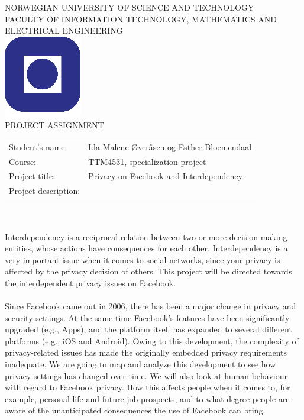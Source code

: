 \documentclass[a4paper,11pt]{article}
\begin{document}
\sffamily
\begin{titlepage}
\begin{center}
\textsc{NORWEGIAN UNIVERSITY OF SCIENCE AND TECHNOLOGY\\
FACULTY OF  INFORMATION TECHNOLOGY, MATHEMATICS AND ELECTRICAL ENGINEERING} \\
\vspace{0.5cm} 
\includegraphics[scale=0.5]{NTNU-logo} \\
\vspace{0.5cm}
{\Huge{PROJECT ASSIGNMENT}}
\vspace{0.5cm}
\end{center}

\begin{tabular}{@{}p{5cm}l}
Student's name:		& Ida Malene Øveråsen og Esther Bloemendaal\\
Course: 		& TTM4531, specialization project \\
Project title: 		& Privacy on Facebook and Interdependency \\
Project description: 	& \\
\end{tabular}
\\
\\
Interdependency is a reciprocal relation between two or more decision-making entities, whose actions have consequences for each other. Interdependency is a very important issue when it comes to social networks, since your privacy is affected by the privacy decision of others. This project will be directed towards the interdependent privacy issues on Facebook.
\paragraph{}
Since Facebook came out in 2006, there has been a major change in privacy and security settings. At the same time Facebook's features have been significantly upgraded (e.g., Apps), and the platform itself has expanded to several different platforms (e.g., iOS and Android). Owing to this development, the complexity of privacy-related issues has made the originally embedded privacy requirements inadequate. We are going to map and analyze this development to see how privacy settings has changed over time. We will also look at human behaviour with regard to Facebook privacy. How this affects people when it comes to, for example, personal life and future job prospects, and to what degree people are aware of the unanticipated consequences the use of Facebook can bring.

\end{titlepage}
\end{document}
